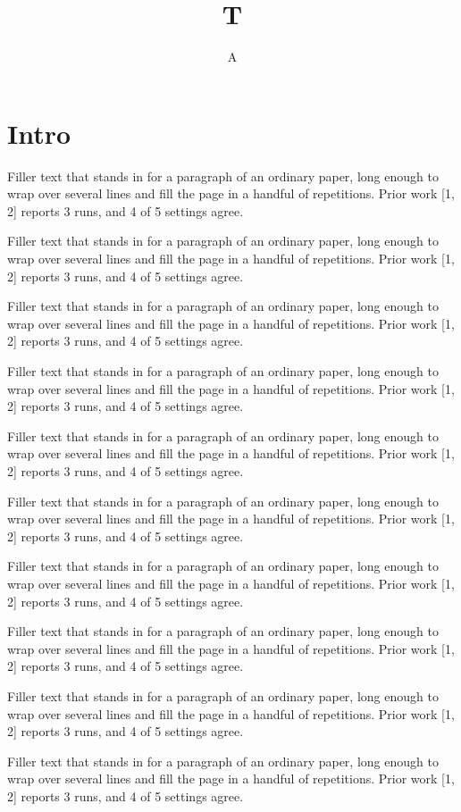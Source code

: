\documentclass{article}
\title{T}\author{A}
\begin{document}
\section{Intro}
Filler text that stands in for a paragraph of an ordinary paper, long enough to wrap over several lines and fill the page in a handful of repetitions. Prior work [1, 2] reports 3 runs, and 4 of 5 settings agree.\par
Filler text that stands in for a paragraph of an ordinary paper, long enough to wrap over several lines and fill the page in a handful of repetitions. Prior work [1, 2] reports 3 runs, and 4 of 5 settings agree.\par
Filler text that stands in for a paragraph of an ordinary paper, long enough to wrap over several lines and fill the page in a handful of repetitions. Prior work [1, 2] reports 3 runs, and 4 of 5 settings agree.\par
Filler text that stands in for a paragraph of an ordinary paper, long enough to wrap over several lines and fill the page in a handful of repetitions. Prior work [1, 2] reports 3 runs, and 4 of 5 settings agree.\par
Filler text that stands in for a paragraph of an ordinary paper, long enough to wrap over several lines and fill the page in a handful of repetitions. Prior work [1, 2] reports 3 runs, and 4 of 5 settings agree.\par
Filler text that stands in for a paragraph of an ordinary paper, long enough to wrap over several lines and fill the page in a handful of repetitions. Prior work [1, 2] reports 3 runs, and 4 of 5 settings agree.\par
Filler text that stands in for a paragraph of an ordinary paper, long enough to wrap over several lines and fill the page in a handful of repetitions. Prior work [1, 2] reports 3 runs, and 4 of 5 settings agree.\par
Filler text that stands in for a paragraph of an ordinary paper, long enough to wrap over several lines and fill the page in a handful of repetitions. Prior work [1, 2] reports 3 runs, and 4 of 5 settings agree.\par
Filler text that stands in for a paragraph of an ordinary paper, long enough to wrap over several lines and fill the page in a handful of repetitions. Prior work [1, 2] reports 3 runs, and 4 of 5 settings agree.\par
Filler text that stands in for a paragraph of an ordinary paper, long enough to wrap over several lines and fill the page in a handful of repetitions. Prior work [1, 2] reports 3 runs, and 4 of 5 settings agree.\par
\end{document}
